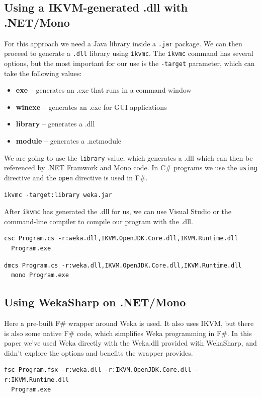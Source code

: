 \documentclass[journal]{IEEEtran/IEEEtran}
\newcommand\ver[1]{%
{\texttt{#1}}}
\newcommand\subsect[1]{\subsection{#1}\noindent}
\begin{document}
\subsect{Using a IKVM-generated .dll with .NET/Mono}For this approach we need a Java library inside a \ver{.jar} package. We can then proceed to generate a \ver{.dll} library using \ver{ikvmc}. The \ver{ikvmc} command has several options, but the most important for our use is the \ver{-target} parameter, which can take the following values:
\begin{itemize}
\item \textbf{exe} -- generates an .exe that runs in a command window
\item \textbf{winexe} -- generates an .exe for GUI applications
\item \textbf{library} -- generates a .dll
\item \textbf{module} -- generates a .netmodule
\end{itemize}
We are going to use the \ver{library} value, which generates a .dll which can then be referenced by .NET Framwork and Mono code. In C\# programs we use the \ver{using} directive and the \ver{open} directive is used in F\#.
\begin{lstlisting}[title={Weka example}]
  ikvmc -target:library weka.jar
\end{lstlisting}
After \ver{ikvmc} has generated the .dll for us, we can use Visual Studio or the command-line compiler to compile our program with the .dll.
\begin{lstlisting}[title={Weka example (.NET)}]
  csc Program.cs -r:weka.dll,IKVM.OpenJDK.Core.dll,IKVM.Runtime.dll
  Program.exe
\end{lstlisting}
\begin{lstlisting}[title={Weka example (Mono)}]
  dmcs Program.cs -r:weka.dll,IKVM.OpenJDK.Core.dll,IKVM.Runtime.dll
  mono Program.exe
\end{lstlisting}

\subsect{Using WekaSharp on .NET/Mono}Here a pre-built F\# wrapper around Weka is used. It also uses IKVM, but there is also some native F\# code, which simplifies Weka programming in F\#. In this paper we've used Weka directly with the Weka.dll provided with WekaSharp, and didn't explore the options and benefits the wrapper provides.
\begin{lstlisting}[title={Weka example (F\#)}]
  fsc Program.fsx -r:weka.dll -r:IKVM.OpenJDK.Core.dll -r:IKVM.Runtime.dll
  Program.exe
\end{lstlisting}
\end{document}
